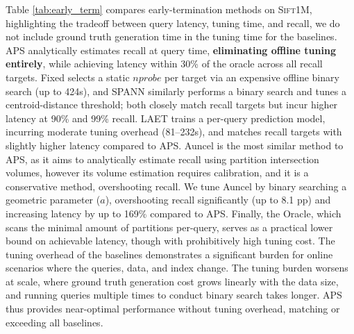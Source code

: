 Table \ref{tab:early_term} compares early-termination methods on \textsc{Sift1M}, highlighting the tradeoff between query latency, tuning time, and recall, we do not include ground truth generation time in the tuning time for the baselines. APS analytically estimates recall at query time, \textbf{eliminating offline tuning entirely}, while achieving latency within 30\% of the oracle across all recall targets. Fixed selects a static $nprobe$ per target via an expensive offline binary search (up to 424s), and SPANN similarly performs a binary search  and tunes a centroid-distance threshold; both closely match recall targets but incur higher latency at 90\% and 99\% recall. LAET trains a per-query prediction model, incurring moderate tuning overhead (81–232s), and matches recall targets with slightly higher latency compared to APS. Auncel is the most similar method to APS, as it aims to analytically estimate recall using partition intersection volumes, however its volume estimation requires calibration, and it is a conservative method, overshooting recall. We tune Auncel by binary searching a geometric parameter ($a$), overshooting recall significantly (up to 8.1 pp) and increasing latency by up to 169\% compared to APS. Finally, the Oracle, which scans the minimal amount of partitions per-query, serves as a practical lower bound on achievable latency, though with prohibitively high tuning cost. The tuning overhead of the baselines demonstrates a significant burden for online scenarios where the queries, data, and index change. The tuning burden worsens at scale, where ground truth generation cost grows linearly with the data size, and running queries multiple times to conduct binary search takes longer. APS thus provides near-optimal performance without tuning overhead, matching or exceeding all baselines.


